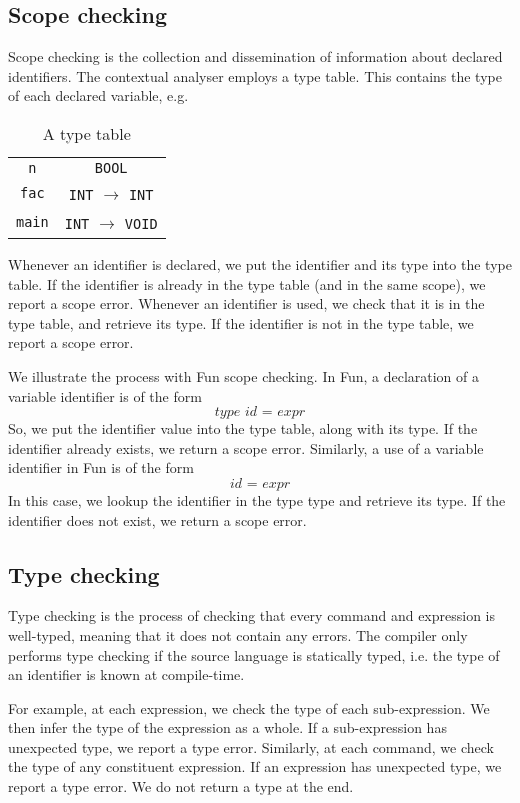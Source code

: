 \documentclass[a4paper, openany]{memoir}
\begin{document}
\subsection{Scope checking}
Scope checking is the collection and dissemination of information about declared identifiers. The contextual analyser employs a type table. This contains the type of each declared variable, e.g.
\begin{table}[H]
    \centering
    \begin{tabular}{c|c}
        \texttt{n} & \texttt{BOOL} \\
        \texttt{fac} & \texttt{INT} $\to$ \texttt{INT} \\
        \texttt{main} & \texttt{INT} $\to$ \texttt{VOID}
    \end{tabular}
    \caption{A type table}
\end{table}

Whenever an identifier is declared, we put the identifier and its type into the type table. If the identifier is already in the type table (and in the same scope), we report a scope error. Whenever an identifier is used, we check that it is in the type table, and retrieve its type. If the identifier is not in the type table, we report a scope error.

We illustrate the process with Fun scope checking. In Fun, a declaration of a variable identifier is of the form
\[\textit{type id } \texttt{=} \textit{ expr}\]
So, we put the identifier value into the type table, along with its type. If the identifier already exists, we return a scope error.
Similarly, a use of a variable identifier in Fun is of the form
\[\textit{id } \texttt{=} \textit{ expr}\]
In this case, we lookup the identifier in the type type and retrieve its type. If the identifier does not exist, we return a scope error.

\subsection{Type checking}
Type checking is the process of checking that every command and expression is well-typed, meaning that it does not contain any errors. The compiler only performs type checking if the source language is statically typed, i.e. the type of an identifier is known at compile-time.

For example, at each expression, we check the type of each sub-expression. We then infer the type of the expression as a whole. If a sub-expression has unexpected type, we report a type error. Similarly, at each command, we check the type of any constituent expression. If an expression has unexpected type, we report a type error. We do not return a type at the end.
\end{document}
